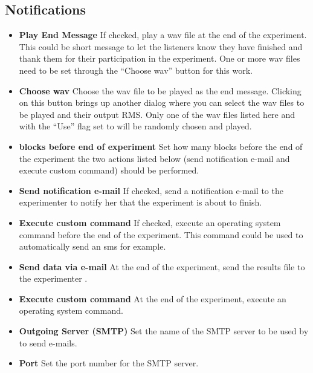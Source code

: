 \documentclass[a4paper,12pt,english]{sphinxmanual}
\begin{document}
\subsection{Notifications}
\label{graphical_user_interface:notifications}\label{graphical_user_interface:sec-edit-pref-dia-notifications}\begin{itemize}
\item {} 
\textbf{Play End Message} If checked, play a wav file at the end of the
experiment. This could be short message to let the listeners know
they have finished and thank them for their participation in the
experiment. One or more wav files need to be set through the “Choose
wav” button for this work.

\item {} 
\textbf{Choose wav} Choose the wav file to be played as the end message.
Clicking on this button brings up another dialog where you can select
the wav files to be played and their output RMS. Only one of the wav
files listed here and with the “Use” flag set to will be randomly
chosen and played.

\item {} 
\textbf{blocks before end of experiment} Set how many blocks before the
end of the experiment the two actions listed below (send notification
e-mail and execute custom command) should be performed.

\item {} 
\textbf{Send notification e-mail} If checked, send a notification e-mail
to the experimenter to notify her that the experiment is about to
finish.

\item {} 
\textbf{Execute custom command} If checked, execute an operating system
command before the end of the experiment. This command could be used
to automatically send an sms for example.

\item {} 
\textbf{Send data via e-mail} At the end of the experiment, send the
results file to the experimenter .

\item {} 
\textbf{Execute custom command} At the end of the experiment, execute an
operating system command.

\item {} 
\textbf{Outgoing Server (SMTP)} Set the name of the SMTP server to be used
by  to send e-mails.

\item {} 
\textbf{Port} Set the port number for the SMTP server.


\end{itemize}
\end{document}
